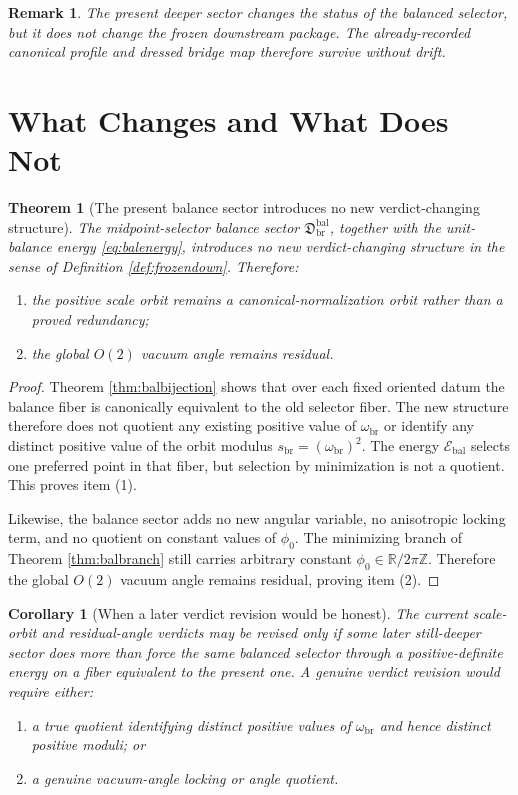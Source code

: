 \documentclass[11pt]{article}
\newcommand{\ScaleMod}{s_{\mathrm{br}}}
\newcommand{\AbsScaleAmp}{\omega_{\mathrm{br}}}
\newcommand{\MidBalanceSector}{\mathfrak D_{\mathrm{br}}^{\mathrm{bal}}}
\newcommand{\BalEnergy}{\mathscr E_{\mathrm{bal}}}
\newtheorem{remark}{Remark}
\newtheorem{corollary}{Corollary}
\newtheorem{theorem}{Theorem}
\begin{document}
\begin{remark}
The present deeper sector changes the status of the balanced selector, but it does not change the frozen downstream package. The already-recorded canonical profile and dressed bridge map therefore survive without drift.
\end{remark}

\section{What Changes and What Does Not}

\begin{theorem}[The present balance sector introduces no new verdict-changing structure]
\label{thm:balverdict}
The midpoint-selector balance sector \(\MidBalanceSector\), together with the unit-balance energy \eqref{eq:balenergy}, introduces no new verdict-changing structure in the sense of Definition \ref{def:frozendown}. Therefore:
\begin{enumerate}
    \item the positive scale orbit remains a canonical-normalization orbit rather than a proved redundancy;
    \item the global \(O(2)\) vacuum angle remains residual.
\end{enumerate}
\end{theorem}

\begin{proof}
Theorem \ref{thm:balbijection} shows that over each fixed oriented datum the balance fiber is canonically equivalent to the old selector fiber. The new structure therefore does not quotient any existing positive value of \(\AbsScaleAmp\) or identify any distinct positive value of the orbit modulus \(\ScaleMod=(\AbsScaleAmp)^{2}\). The energy \(\BalEnergy\) selects one preferred point in that fiber, but selection by minimization is not a quotient. This proves item (1).

Likewise, the balance sector adds no new angular variable, no anisotropic locking term, and no quotient on constant values of \(\phi_{0}\). The minimizing branch of Theorem \ref{thm:balbranch} still carries arbitrary constant \(\phi_{0}\in\mathbb R/2\pi\mathbb Z\). Therefore the global \(O(2)\) vacuum angle remains residual, proving item (2).
\end{proof}

\begin{corollary}[When a later verdict revision would be honest]
\label{cor:balrevision}
The current scale-orbit and residual-angle verdicts may be revised only if some later still-deeper sector does more than force the same balanced selector through a positive-definite energy on a fiber equivalent to the present one. A genuine verdict revision would require either:
\begin{enumerate}
    \item a true quotient identifying distinct positive values of \(\AbsScaleAmp\) and hence distinct positive moduli; or
    \item a genuine vacuum-angle locking or angle quotient.
\end{enumerate}
\end{corollary}
\end{document}
